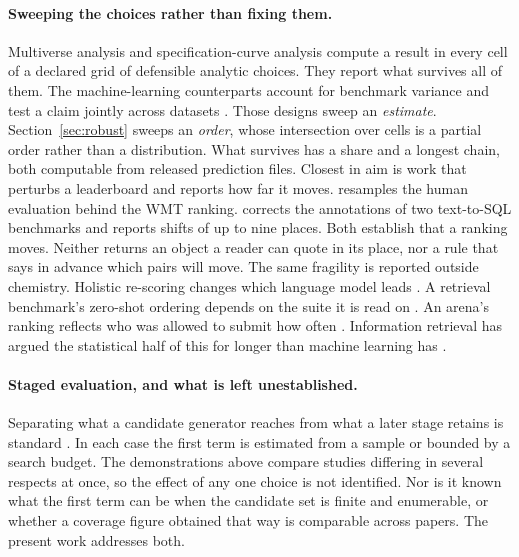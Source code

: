 \documentclass{article}
\begin{document}
\paragraph{Sweeping the choices rather than fixing them.} Multiverse analysis \citep{Steegen_2016}
and specification-curve analysis \citep{Simonsohn_2020} compute a result in every cell of a declared
grid of defensible analytic choices. They report what survives all of them. The machine-learning
counterparts account for benchmark variance \citep{Bouthillier_2021} and test a claim jointly across
datasets \citep{Dror_2017}. Those designs sweep an \emph{estimate}. Section~\ref{sec:robust} sweeps
an \emph{order}, whose intersection over cells is a partial order rather than a distribution. What
survives has a share and a longest chain, both computable from released prediction files. Closest in
aim is work that perturbs a leaderboard and reports how far it moves. \citet{Knowles_2021} resamples
the human evaluation behind the WMT ranking. \citet{Jin_2026} corrects the annotations of two
text-to-SQL benchmarks and reports shifts of up to nine places. Both establish that a ranking moves.
Neither returns an object a reader can quote in its place, nor a rule that says in advance which
pairs will move. The same fragility is reported outside chemistry. Holistic re-scoring changes which
language model leads \citep{Liang_2023_helm}. A retrieval benchmark's zero-shot ordering depends on
the suite it is read on \citep{Thakur_2021_beir}. An arena's ranking reflects who was allowed to
submit how often \citep{Singh_2025_illusion}. Information retrieval has argued the statistical half
of this for longer than machine learning has \citep{Sakai_2014, Buckley_2004}.

\paragraph{Staged evaluation, and what is left unestablished.} Separating what a candidate generator
reaches from what a later stage retains is standard \citep{Wang_2011_cascade, Covington_2016,
Karpukhin_2020, Maziarz_2025}. In each case the first term is estimated from a sample or bounded by
a search budget. The demonstrations above compare studies differing in several respects at once, so
the effect of any one choice is not identified. Nor is it known what the first term can be when the
candidate set is finite and enumerable, or whether a coverage figure obtained that way is comparable
across papers. The present work addresses both.
\end{document}
